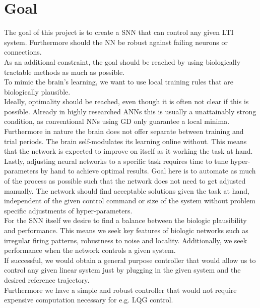 \section{Goal}\label{sec:goal}
The goal of this project is to create a \ac{SNN} that can control any given \ac{LTI} system. Furthermore should the \ac{NN} be robust against failing neurons or connections.\\
As an additional constraint, the goal should be reached by using biologically tractable methods as much as possible.\\
To mimic the brain's learning, we want to use local training rules that are biologically plausible.\\
Ideally, optimality should be reached, even though it is often not clear if this is possible. Already in highly researched \acp{ANN} this is usually a unattainably strong condition, as conventional \acp{NN} using \ac{GD} only guarantee a local minima.\\
Furthermore in nature the brain does not offer separate between training and trial periods. The brain self-modulates its learning online without. This means that the network is expected to improve on itself as it working the task at hand.\\
Lastly, adjusting neural networks to a specific task requires time to tune hyper-parameters by hand to achieve optimal results. Goal here is to automate as much of the process as possible such that the network does not need to get adjusted manually. The network should find acceptable solutions given the task at hand, independent of the given control command or size of the system without problem specific adjustments of hyper-parameters.\\
For the \ac{SNN} itself we desire to find a balance between the biologic plausibility and performance. This means we seek key features of biologic networks such as irregular firing patterns, robustness to noise and locality. Additionally, we seek performance when the network controls a given system.\\
If successful, we would obtain a general purpose controller that would allow us to control any given linear system just by plugging in the given system and the desired reference trajectory.\\
Furthermore we have a simple and robust controller that would not require expensive computation necessary for e.g. LQG control.

